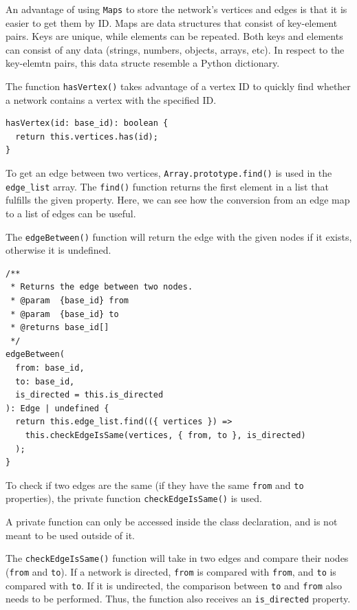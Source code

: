 An advantage of using \texttt{Maps}
to store the network's vertices and edges is that it is easier to get
them by ID.
Maps are data structures that consist of key-element pairs.
Keys are unique, while elements can be repeated.
Both keys and elements can consist of any data (strings, numbers, objects, arrays, etc).
In respect to the key-elemtn pairs, this data structe resemble a Python dictionary.

The function \texttt{hasVertex()} takes advantage of
a vertex ID to quickly find whether a network contains a
vertex with the specified ID.

\begin{verbatim}
hasVertex(id: base_id): boolean {
  return this.vertices.has(id);
}
\end{verbatim}

To get an edge between two vertices, \texttt{Array.prototype.find()}
is used in the \texttt{edge_list} array.
The \texttt{find()}
function returns the first element in a list that fulfills the given property.
Here, we can see how the conversion from an edge map to a list of edges
can be useful.

The \texttt{edgeBetween()} function will return the edge with the given nodes if it exists,
otherwise it is undefined.

\begin{verbatim}
/**
 * Returns the edge between two nodes.
 * @param  {base_id} from
 * @param  {base_id} to
 * @returns base_id[]
 */
edgeBetween(
  from: base_id,
  to: base_id,
  is_directed = this.is_directed
): Edge | undefined {
  return this.edge_list.find(({ vertices }) =>
    this.checkEdgeIsSame(vertices, { from, to }, is_directed)
  );
}
\end{verbatim}

To check if two edges are the same
(if they have the same \texttt{from} and \texttt{to} properties),
the private function \texttt{checkEdgeIsSame()} is used.

A private function can only be accessed inside the class declaration,
and is not meant to be used outside of it.

The \texttt{checkEdgeIsSame()} function will take in two edges and compare their nodes
(\texttt{from} and \texttt{to}).
If a network is directed, \texttt{from} is compared with \texttt{from},
and \texttt{to} is compared with \texttt{to}.
If it is undirected, the comparison between \texttt{to} and \texttt{from}
also needs to be performed.
Thus, the function also receives an \texttt{is_directed} property.

